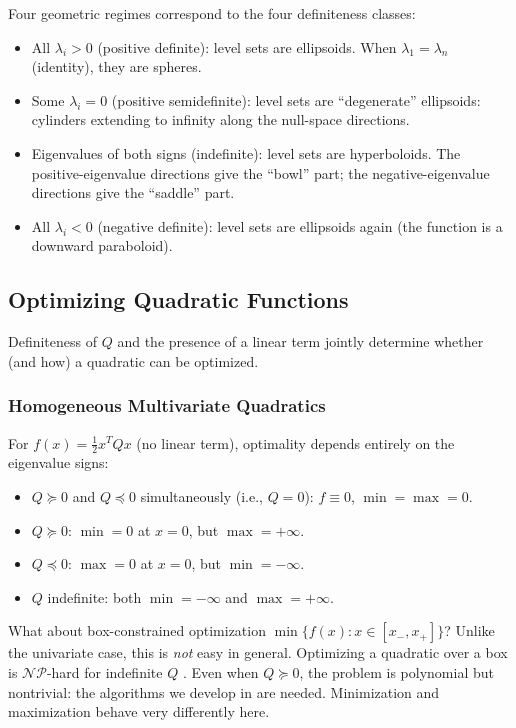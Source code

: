 Four geometric regimes correspond to the four definiteness classes:
\begin{itemize}
	\item All $\lambda_i > 0$ (positive definite): level sets are ellipsoids.
		When $\lambda_1 = \lambda_n$ (identity), they are spheres.
	\item Some $\lambda_i = 0$ (positive semidefinite): level sets are ``degenerate'' ellipsoids: cylinders extending to infinity along the null-space directions.
	\item Eigenvalues of both signs (indefinite): level sets are hyperboloids.
		The positive-eigenvalue directions give the ``bowl'' part; the negative-eigenvalue directions give the ``saddle'' part.
	\item All $\lambda_i < 0$ (negative definite): level sets are ellipsoids again (the function is a downward paraboloid).
\end{itemize}


\subsection{Optimizing Quadratic Functions}\label{sec:opt-quad}

Definiteness of $Q$ and the presence of a linear term jointly determine whether (and how) a quadratic can be optimized.

\subsubsection{Homogeneous Multivariate Quadratics}\label{sec:opt-quad-hom}

For $f(x) = \frac{1}{2} x^T Q x$ (no linear term), optimality depends entirely on the eigenvalue signs:
\begin{itemize}
	\item $Q \succeq 0$ and $Q \preceq 0$ simultaneously (i.e., $Q = 0$): $f \equiv 0$, $\min = \max = 0$.
	\item $Q \succeq 0$: $\min = 0$ at $x = 0$, but $\max = +\infty$.
	\item $Q \preceq 0$: $\max = 0$ at $x = 0$, but $\min = -\infty$.
	\item $Q$ indefinite: both $\min = -\infty$ and $\max = +\infty$.
\end{itemize}

What about box-constrained optimization $\min\{f(x) : x \in [x_-, x_+]\}$?
Unlike the univariate case, this is \emph{not} easy in general.
Optimizing a quadratic over a box is $\mathcal{NP}$-hard for indefinite $Q$ \cite{deklerk2008}.
Even when $Q \succeq 0$, the problem is polynomial but nontrivial: the algorithms we develop in  are needed.
Minimization and maximization behave very differently here.


